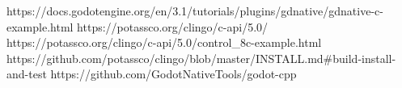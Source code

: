


https://docs.godotengine.org/en/3.1/tutorials/plugins/gdnative/gdnative-c-example.html
https://potassco.org/clingo/c-api/5.0/
https://potassco.org/clingo/c-api/5.0/control_8c-example.html
https://github.com/potassco/clingo/blob/master/INSTALL.md#build-install-and-test
https://github.com/GodotNativeTools/godot-cpp
